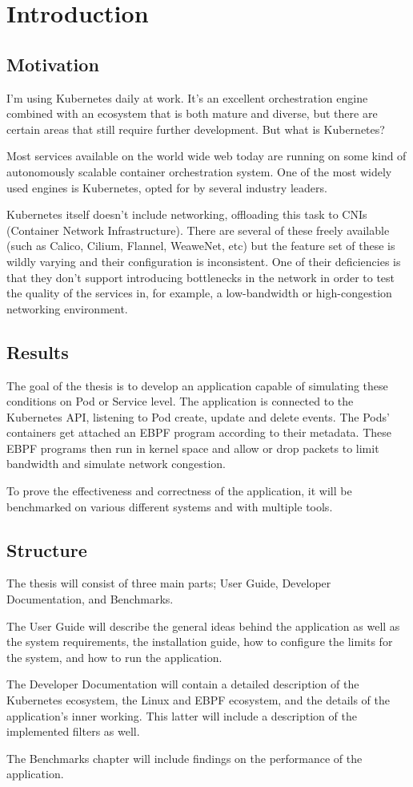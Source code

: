 \chapter{Introduction} %
\label{ch:intro}

\section{Motivation}
I'm using Kubernetes\cite{kubernetes} daily at work. It's an excellent orchestration engine combined with an ecosystem that is both mature and diverse, but there are certain areas that still require further development. But what is Kubernetes?

Most services available on the world wide web today are running on some kind of autonomously scalable container orchestration system. One of the most widely used engines is Kubernetes, opted for by several industry leaders.

Kubernetes itself doesn't include networking, offloading this task to CNIs (Container Network Infrastructure). There are several of these freely available (such as Calico, Cilium, Flannel, WeaweNet, etc) but the feature set of these is wildly varying and their configuration is inconsistent. One of their deficiencies is that they don't support introducing bottlenecks in the network in order to test the quality of the services in, for example, a low-bandwidth or high-congestion networking environment.


\section{Results}
The goal of the thesis is to develop an application capable of simulating these conditions on Pod or Service level. The application is connected to the Kubernetes API, listening to Pod create, update and delete events. The Pods' containers get attached an EBPF program according to their metadata. These EBPF programs then run in kernel space and allow or drop packets to limit bandwidth and simulate network congestion.

To prove the effectiveness and correctness of the application, it will be benchmarked on various different systems and with multiple tools.

\section{Structure}
The thesis will consist of three main parts; User Guide, Developer Documentation, and Benchmarks.
\bigbreak

The User Guide will describe the general ideas behind the application as well as the system requirements, the installation guide, how to configure the limits for the system, and how to run the application.
\bigbreak

The Developer Documentation will contain a detailed description of the Kubernetes ecosystem, the Linux and EBPF ecosystem, and the details of the application's inner working. This latter will include a description of the implemented filters as well.
\bigbreak

The Benchmarks chapter will include findings on the performance of the application.